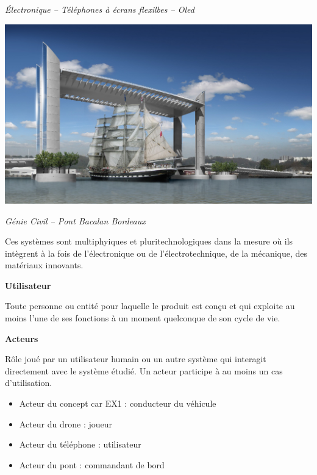\documentclass[11pt,oneside]{article}
\begin{document}
\begin{exemple}
\begin{minipage}[c]{.22\linewidth}
\begin{center}
\textit{Électronique -- Téléphones à écrans flexilbes -- \textit{Oled} \cite{oled}}
\end{center}
\end{minipage}\hfill
\begin{minipage}[c]{.22\linewidth}
\begin{center}
\includegraphics[width=\textwidth]{png/pont_bacalan}

\textit{Génie Civil -- Pont Bacalan Bordeaux\cite{pont}}
\end{center}
\end{minipage}

Ces systèmes sont multiphyiques et pluritechnologiques dans la mesure où ils intègrent à la fois de l'électronique ou de l'électrotechnique, de la mécanique, des matériaux innovants. 

\end{exemple}


\begin{defi}

\textbf{Utilisateur} \cite{norme}

Toute personne ou entité pour laquelle le produit est conçu et qui exploite au moins l'une de ses fonctions à un moment quelconque de son cycle de vie.


\textbf{Acteurs}\cite{roques}

Rôle joué par un utilisateur humain ou un autre système qui interagit directement avec le système étudié. Un acteur participe à au moins un cas d'utilisation.

\end{defi}

\begin{exemple}
\begin{itemize}
\item Acteur du concept car EX1 : conducteur du véhicule
\item Acteur du drone : joueur
\item Acteur du téléphone : utilisateur 
\item Acteur du pont : commandant de bord
\end{itemize}
\end{exemple}
\end{document}
